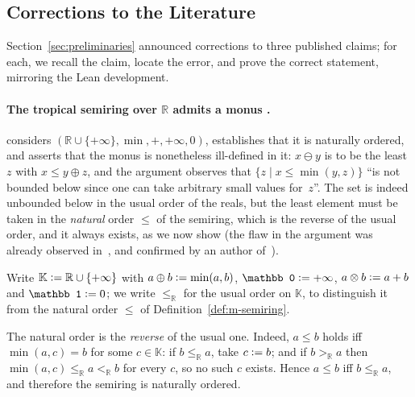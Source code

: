 \begin{toappendix}
  \subsection{Corrections to the Literature}
  \label{appendix:corrections}
  Section~\ref{sec:preliminaries} announced corrections to three
  published claims; for each, we recall the claim, locate the error, and
  prove the correct statement, mirroring the Lean development.

  \paragraph*{The tropical semiring over $\mathbb R$ admits a monus
  .}
  \cite[Example~4]{geerts2010database} considers
  $(\mathbb R\cup\{+\infty\},\min,+,+\infty,0)$, establishes that it is
  naturally ordered, and asserts that the monus is nonetheless
  ill-defined in it: $x\ominus y$ is to be the least $z$ with
  $x\leq y\oplus z$, and the argument observes that
  $\{z \mid x\leq\min(y,z)\}$ ``is not bounded below since one can take
  arbitrary small values for~$z$''. The set is indeed unbounded below in
  the usual order of the reals, but the least element must be taken in
  the \emph{natural} order $\leq$ of the semiring, which is the reverse
  of the usual order, and it always exists, as we now show (the flaw in the argument was already
  observed in~\cite{amarilli2016example}, and confirmed by an author
  of~\cite{geerts2010database}).

  Write $\mathbb K \mathrel{\mathop:}= \mathbb R\cup\{+\infty\}$ with $a\oplus b\mathrel{\mathop:}=
  \min(a,b)$, $\mathbb 0\defeq+\infty$, $a\otimes b\mathrel{\mathop:}= a+b$ and $\mathbb
  1\defeq 0$; we write $\leq_{\mathbb R}$ for the usual order on $\mathbb K$,
  to distinguish it from the natural order $\leq$ of
  Definition~\ref{def:m-semiring}.

  The natural order is the \emph{reverse} of the usual one. Indeed, $a\leq b$
  holds iff $\min(a,c)=b$ for some $c\in\mathbb K$: if $b\leq_{\mathbb R}a$,
  take $c\mathrel{\mathop:}= b$; and if $b>_{\mathbb R}a$ then $\min(a,c)\leq_{\mathbb
  R}a<_{\mathbb R}b$ for every $c$, so no such $c$ exists. Hence $a\leq b$
  iff $b\leq_{\mathbb R}a$, and therefore the semiring is naturally ordered.


\end{toappendix}
